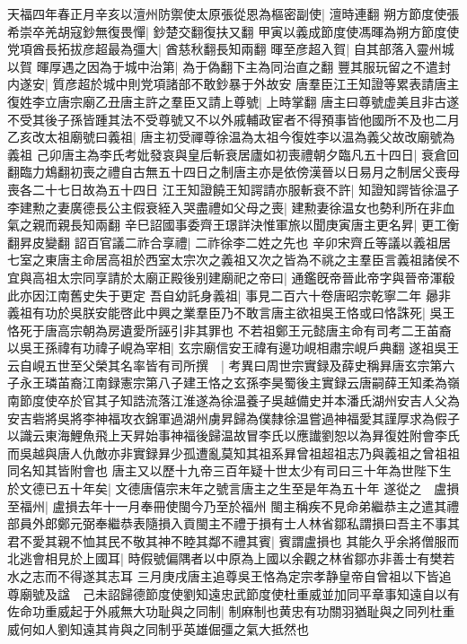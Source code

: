 天福四年春正月辛亥以澶州防禦使太原張從恩為樞密副使|{
	澶時連翻}
朔方節度使張希崇卒羌胡寇鈔無復畏憚|{
	鈔楚交翻復扶又翻}
甲寅以義成節度使馮暉為朔方節度使党項酋長拓拔彦超最為彊大|{
	酋慈秋翻長知兩翻}
暉至彦超入賀|{
	自其部落入靈州城以賀}
暉厚遇之因為于城中治第|{
	為于偽翻下主為同治直之翻}
豐其服玩留之不遣封内遂安|{
	質彦超於城中則党項諸部不敢鈔暴于外故安}
唐羣臣江王知證等累表請唐主復姓李立唐宗廟乙丑唐主許之羣臣又請上尊號|{
	上時掌翻}
唐主曰尊號虚美且非古遂不受其後子孫皆踵其法不受尊號又不以外戚輔政宦者不得預事皆他國所不及也二月乙亥改太祖廟號曰義祖|{
	唐主初受禪尊徐温為太祖今復姓李以温為義父故改廟號為義祖}
己卯唐主為李氏考妣發哀與皇后斬衰居廬如初喪禮朝夕臨凡五十四日|{
	衰倉回翻臨力鴆翻初喪之禮自古無五十四日之制唐主亦是依傍漢晉以日易月之制居父喪母喪各二十七日故為五十四日}
江王知證饒王知諤請亦服斬衰不許|{
	知證知諤皆徐温子}
李建勲之妻廣德長公主假衰絰入哭盡禮如父母之喪|{
	建勲妻徐温女也勢利所在非血氣之親而親長知兩翻}
辛巳詔國事委齊王璟詳決惟軍旅以聞庚寅唐主更名昇|{
	更工衡翻昇皮變翻}
詔百官議二祚合享禮|{
	二祚徐李二姓之先也}
辛卯宋齊丘等議以義祖居七室之東唐主命居高祖於西室太宗次之義祖又次之皆為不祧之主羣臣言義祖諸侯不宜與高祖太宗同享請於太廟正殿後别建廟祀之帝曰|{
	通鑑旣帝晉此帝字與晉帝渾殽此亦因江南舊史失于更定}
吾自幼託身義祖|{
	事見二百六十卷唐昭宗乾寧二年}
曏非義祖有功於吳朕安能啓此中興之業羣臣乃不敢言唐主欲祖吳王恪或曰恪誅死|{
	吳王恪死于唐高宗朝為房遺愛所誣引非其罪也}
不若祖鄭王元懿唐主命有司考二王苖裔以吳王孫禕有功禕子峴為宰相|{
	玄宗廟信安王禕有邊功峴相肅宗峴戶典翻}
遂祖吳王云自峴五世至父榮其名率皆有司所撰　|{
	考異曰周世宗實録及薛史稱昪唐玄宗第六子永王璘苖裔江南録憲宗第八子建王恪之玄孫李昊蜀後主實録云唐嗣薛王知柔為嶺南節度使卒於官其子知誥流落江淮遂為徐温養子吳越備史并本潘氏湖州安吉人父為安吉砦將吳將李神福攻衣錦軍過湖州虜昇歸為僕隸徐温嘗過神福愛其謹厚求為假子以識云東海鯉魚飛上天昇始事神福後歸温故冒李氏以應䜟劉恕以為昪復姓附會李氏而吳越與唐人仇敵亦非實録昪少孤遭亂莫知其祖系昪曾祖超祖志乃與義祖之曾祖祖同名知其皆附會也}
唐主又以歷十九帝三百年疑十世太少有司曰三十年為世陛下生於文德已五十年矣|{
	文德唐僖宗末年之號言唐主之生至是年為五十年}
遂從之　盧損至福州|{
	盧損去年十一月奉冊使閩今乃至於福州}
閩主稱疾不見命弟繼恭主之遣其禮部員外郎鄭元弼奉繼恭表隨損入貢閩主不禮于損有士人林省鄒私謂損曰吾主不事其君不愛其親不恤其民不敬其神不睦其鄰不禮其賓|{
	賓謂盧損也}
其能久乎余將僧服而北逃會相見於上國耳|{
	時假號偏隅者以中原為上國以余觀之林省鄒亦非善士有樊若水之志而不得遂其志耳}
三月庚戌唐主追尊吳王恪為定宗孝静皇帝自曾祖以下皆追尊廟號及諡　己未詔歸德節度使劉知遠忠武節度使杜重威並加同平章事知遠自以有佐命功重威起于外戚無大功耻與之同制|{
	制麻制也黄忠有功關羽猶耻與之同列杜重威何如人劉知遠其肯與之同制乎英雄倔彊之氣大抵然也}
